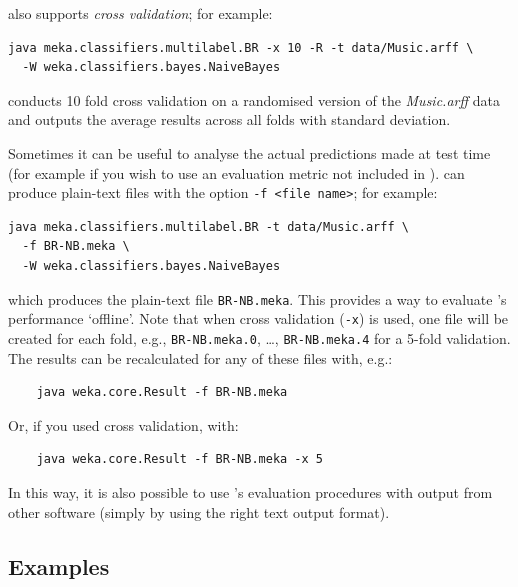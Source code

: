 \documentclass[11pt]{article}
\newcommand{\MEKA}{Meka}
\begin{document}
\framework{\MEKA} also supports \emph{cross validation}; for example:
\begin{lstlisting}
java meka.classifiers.multilabel.BR -x 10 -R -t data/Music.arff \
  -W weka.classifiers.bayes.NaiveBayes
\end{lstlisting}
conducts 10 fold cross validation on a randomised version of the \textit{Music.arff} data and outputs the average results across all folds with standard deviation. %

Sometimes it can be useful to analyse the actual predictions made at test time (for example if you wish to use an evaluation metric not included in \framework{\MEKA}). \framework{\MEKA} can produce plain-text files with the option \texttt{-f <file name>}; for example:
\begin{lstlisting}
java meka.classifiers.multilabel.BR -t data/Music.arff \ 
  -f BR-NB.meka \
  -W weka.classifiers.bayes.NaiveBayes
\end{lstlisting}
which produces the plain-text file \texttt{BR-NB.meka}. This provides a way to evaluate \framework{\MEKA}'s performance `offline'. Note that when cross validation (\texttt{-x}) is used, one file will be created for each fold, e.g., \texttt{BR-NB.meka.0}, \ldots, \texttt{BR-NB.meka.4} for a 5-fold validation. The results can be recalculated for any of these files with, e.g.:
\begin{lstlisting}
	java weka.core.Result -f BR-NB.meka
\end{lstlisting}
Or, if you used cross validation, with:
\begin{lstlisting}
	java weka.core.Result -f BR-NB.meka -x 5
\end{lstlisting}
In this way, it is also possible to use \framework{\MEKA}'s evaluation procedures with output from other software (simply by using the right text output format).

\subsection{Examples} 


\end{document}
